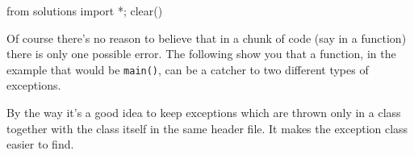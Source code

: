 \begin{python0}
from solutions import *; clear()
\end{python0}

Of course there's no reason to believe that in a chunk
of code (say in a function) there is only one possible error. The
following show you that a function, in the example that would be
\texttt{main()}, can be a catcher to two different types of exceptions.



By the way it's a good idea to keep exceptions which are
thrown only in a class together with the class itself in the same header
file. It makes the exception class easier to find.

